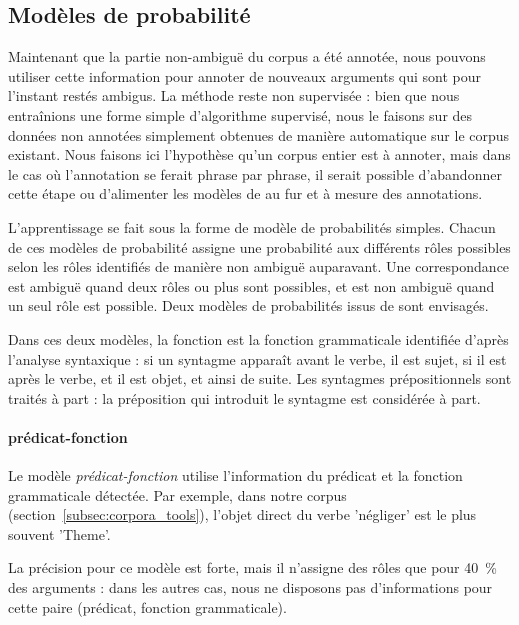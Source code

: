 
\subsection{Modèles de probabilité}
\label{subsec:probability}

Maintenant que la partie non-ambiguë du corpus a été annotée, nous pouvons
utiliser cette information pour annoter de nouveaux arguments qui sont pour
l'instant restés ambigus. La méthode reste non supervisée : bien que nous
entraînions une forme simple d'algorithme supervisé, nous le faisons sur des
données non annotées simplement obtenues de manière automatique sur le corpus
existant. Nous faisons ici l'hypothèse qu'un corpus entier est à annoter, mais
dans le cas où l'annotation se ferait phrase par phrase, il serait possible
d'abandonner cette étape ou d'alimenter les modèles de au fur et à mesure des
annotations.

L'apprentissage se fait sous la forme de modèle de probabilités simples.
Chacun de ces modèles de probabilité assigne une probabilité aux différents
rôles possibles selon les rôles identifiés de manière non ambiguë auparavant.
Une correspondance est ambiguë quand deux rôles ou plus sont possibles, et est
non ambiguë quand un seul rôle est possible. Deux modèles de probabilités issus
de \citep{swier2005exploiting} sont envisagés.


Dans ces deux modèles, la fonction est la fonction grammaticale identifiée
d'après l'analyse syntaxique : si un syntagme apparaît avant le verbe, il est
sujet, si il est après le verbe, et il est objet, et ainsi de suite. Les
syntagmes prépositionnels sont traités à part : la préposition qui introduit le
syntagme est considérée à part.

\paragraph{prédicat-fonction}

Le modèle \emph{prédicat-fonction} utilise l'information du prédicat et la
fonction grammaticale détectée. Par exemple, dans notre corpus
(section~\ref{subsec:corpora_tools}), l'objet direct du verbe 'négliger' est le
plus souvent 'Theme'.

La précision pour ce modèle est forte, mais il n'assigne des rôles que pour
40~\% des arguments : dans les autres cas, nous ne disposons pas d'informations
pour cette paire (prédicat, fonction grammaticale).

